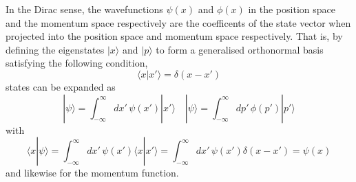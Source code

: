 \vspace{2ex}
\begin{defi}
In the Dirac sense, the wavefunctions $\psi (x)$ and $\phi (x)$ in the position space and the momentum space respectively are the coefficents of the state vector when projected into the position space and momentum space respectively. That is, by defining the eigenstates $|x\rangle $ and $|p\rangle $ to form a generalised orthonormal basis satisfying the following condition,
\[\langle x|x'\rangle =\delta (x-x')\]
states can be expanded as 
\[|\psi \rangle =\int ^{\infty }_{-\infty }dx'\,\psi (x')|x'\rangle \quad |\psi \rangle =\int ^{\infty }_{-\infty }dp'\,\phi (p')|p'\rangle \]
with
\[\langle x|\psi \rangle =\int ^{\infty }_{-\infty }dx'\,\psi (x')\langle x|x'\rangle =\int ^{\infty }_{-\infty }dx'\,\psi (x')\delta (x-x')=\psi (x)\]
and likewise for the momentum function. 
\end{defi}
\vspace{2ex}

